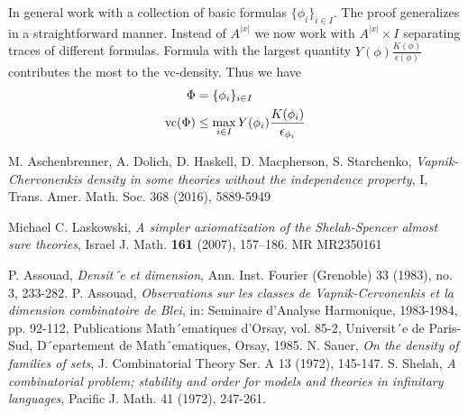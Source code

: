 \documentclass{amsart}
\newcommand{\AX}{A^{|x|}}
\begin{document}
In general work with a collection of basic formulas $\{\phi_i\}_{i \in I}$.
The proof generalizes in a straightforward manner.
Instead of $\AX$ we now work with $\AX \times I$ separating traces of different formulas.
Formula with the largest quantity $Y(\phi)\frac{K(\phi)}{\epsilon(\phi)}$ contributes the most to the vc-density.
Thus we have
\begin{align*}
  \Phi &= \{\phi_i\}_{i \in I} \\
  \operatorname{vc}(\Phi) &\leq   \max_{i \in I} Y(\phi_i) \frac{K(\phi_i)}{\epsilon_{\phi_i}}
\end{align*}


\begin{thebibliography}{9}

  M. Aschenbrenner, A. Dolich, D. Haskell, D. Macpherson, S. Starchenko,
  \textit{Vapnik-Chervonenkis density in some theories without the independence property}, I,
  Trans. Amer. Math. Soc. 368 (2016), 5889-5949
  
  Michael C. Laskowski, \textit{A simpler axiomatization of the Shelah-Spencer almost sure theories},
  Israel J. Math. \textbf{161} (2007), 157–186. MR MR2350161	

  P. Assouad, \textit{Densit´e et dimension}, Ann. Inst. Fourier (Grenoble) 33 (1983), no. 3, 233-282.
  P. Assouad, \textit{Observations sur les classes de Vapnik-Cervonenkis et la dimension combinatoire de Blei},
  in: Seminaire d’Analyse Harmonique, 1983-1984, pp. 92-112, Publications Math´ematiques
  d’Orsay, vol. 85-2, Universit´e de Paris-Sud, D´epartement de Math´ematiques, Orsay, 1985.
  N. Sauer, \textit{On the density of families of sets}, J. Combinatorial Theory Ser. A 13 (1972), 145-147.
  S. Shelah, \textit{A combinatorial problem; stability and order for models and theories in infinitary languages},
  Pacific J. Math. 41 (1972), 247-261.

\end{thebibliography}
\end{document}
